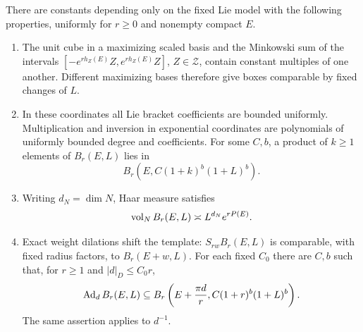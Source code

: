 \begin{lemma}\label{lem:box-calculus}
There are constants depending only on the fixed Lie model with the
following properties, uniformly for $r\ge0$ and nonempty compact $E$.
\begin{enumerate}
\item The unit cube in a maximizing scaled basis and the Minkowski sum of the
intervals $[-e^{rh_Z(E)}Z,e^{rh_Z(E)}Z]$, $Z\in\mathcal Z$, contain
constant multiples of one another. Different maximizing bases therefore
give boxes comparable by fixed changes of $L$.
\item In these coordinates all Lie bracket coefficients are bounded
uniformly. Multiplication and inversion in exponential coordinates are
polynomials of uniformly bounded degree and coefficients. For some
$C,b$, a product of $k\ge1$ elements of $B_r(E,L)$ lies in
\[
 B_r(E,C(1+k)^b(1+L)^b).
\]
\item Writing $d_N=\dim N$, Haar measure satisfies
\begin{equation}\label{eq:box-volume}
 \operatorname{vol}_N B_r(E,L)\asymp L^{d_N}e^{rP(E)}.
\end{equation}
\item Exact weight dilations shift the template:
$S_{rw}B_r(E,L)$ is comparable, with fixed radius factors, to
$B_r(E+w,L)$. For each fixed $C_0$ there are $C,b$ such that, for
$r\ge1$ and $|d|_D\le C_0r$,
\begin{equation}\label{eq:box-conjugation}
 \operatorname{Ad}_d B_r(E,L)\subseteq
 B_r\left(E+\frac{\pi d}{r},C(1+r)^b(1+L)^b\right).
\end{equation}
The same assertion applies to $d^{-1}$.
\end{enumerate}
\end{lemma}

